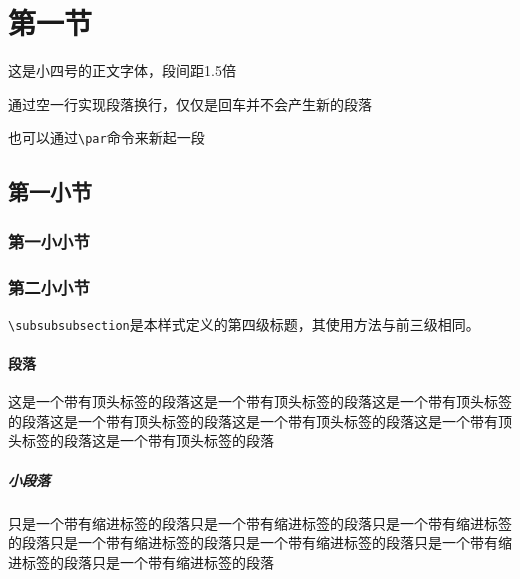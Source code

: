 \documentclass[supercite]{HustGraduPaper}
\begin{document}
	\tableofcontents
	
	\clearpage%
	
	\section{第一节}
	这是小四号的正文字体，段间距1.5倍
	
	通过空一行实现段落换行，仅仅是回车并不会产生新的段落
	\par 也可以通过\verb|\par|命令来新起一段
	\subsection{第一小节}
	\subsubsection{第一小小节}
	\subsubsection{第二小小节}
	\label{subsubsubsec:subsubsubsec}
	
	\verb|\subsubsubsection|是本样式定义的第四级标题，其使用方法与前三级相同。
	
	\paragraph{段落}\label{para:para}这是一个带有顶头标签的段落这是一个带有顶头标签的段落这是一个带有顶头标签的段落这是一个带有顶头标签的段落这是一个带有顶头标签的段落这是一个带有顶头标签的段落这是一个带有顶头标签的段落
	\subparagraph{小段落}\label{subpara:subpara}只是一个带有缩进标签的段落只是一个带有缩进标签的段落只是一个带有缩进标签的段落只是一个带有缩进标签的段落只是一个带有缩进标签的段落只是一个带有缩进标签的段落只是一个带有缩进标签的段落
\end{document}
